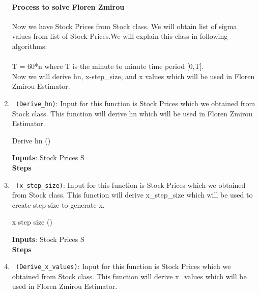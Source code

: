 \begin{enumerate}
\paragraph{Process to solve Floren Zmirou}
Now we have Stock Prices from Stock class. We will obtain list of sigma values from list of Stock Prices.We will explain this class in following algorithms:\\\\
T = 60*n where T is the minute to minute time period [0,T].\\
Now we will derive hn, x-step\_size, and x values which will be used in Floren Zmirou Estimator.
  \item \verb! (Derive_hn)!: Input for this function is Stock Prices which we obtained from Stock class. 
  This function will derive hn which will be used in Floren Zmirou Estimator.
  \begin{algorithm}
  \caption{Derive hn ()}
  \bigskip
  \textbf{Inputs}: Stock Prices S\\
  \textbf{Steps}
  \end{algorithm}
  \item \verb! (x_step_size)!: Input for this function is Stock Prices which we obtained from Stock class. 
  This function will derive x\_step\_size which will be used  to create step size to generate x.
  \begin{algorithm}
  \caption{x step size ()}
  \bigskip
  \textbf{Inputs}: Stock Prices S\\
  \textbf{Steps}
  \end{algorithm}
  \item \verb! (Derive_x_values)!: Input for this function is Stock Prices which we obtained from Stock class. 
  This function will derive x\_values which will be used  in Floren Zmirou Estimator.

\end{enumerate}
